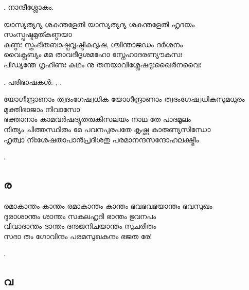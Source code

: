 \begin{enumerate}


. നാന്ദീശ്ലോകം.

\begin{slokam}{\VSv}{\KD}{യാസ്യത്യദ്യ ശകുന്തളേതി}
യാസ്യത്യദ്യ ശകുന്തളേതി ഹൃദയം സംസ്പൃഷ്ടമുത്കണ്ഠയാ\\
കണ്ഠഃ സ്തംഭിതബാഷ്പവൃഷ്ടികലുഷ, ശ്ചിന്താജഡം ദർശനം \\
വൈക്ലബ്യം മമ താവദീദൃശമഹോ സ്നേഹാദരണ്യൗകസഃ \\
പീഡ്യന്തേ ഗൃഹിണഃ കഥം നു തനയാവിശ്ലേഷദുഃഖൈർനവൈഃ
\end{slokam}



. പരിഭാഷകൾ: ,
.


\begin{slokam}{\VSr}{\Melp}{യോഗീന്ദ്രാണാം ത്വദംഗേഷ്വധിക}
യോഗീന്ദ്രാണാം ത്വദംഗേഷ്വധികസുമധുരം മുക്തിഭാജാം നിവാസോ\\
ഭക്താനാം കാമവർഷദ്യുതരുകിസലയം നാഥ തേ പാദമൂലം\\
നിത്യം ചിത്തസ്ഥിതം മേ പവനപുരപതേ കൃഷ്ണ കാരുണ്യസിന്ധോ\\
ഹൃത്വാ നിഃശേഷതാപാൻപ്രദിശതു പരമാനന്ദസന്ദോഹലക്ഷ്മീം
\end{slokam}


.



\end{enumerate}

\subsection{ര}

\begin{enumerate}

\begin{slokam}{\VSk}{\Unk}{രമാകാന്തം കാന്തം}
രമാകാന്തം കാന്തം ഭവഭവഭയാന്തം ഭവസുഖം\\
ദുരാശാന്തം ശാന്തം സകലഹൃദി ഭാന്തം ഭുവനപം\\
വിവാദാന്തം ദാന്തം ദനുജനിചയാന്തം സുചരിതം\\
സദാ തം ഗോവിന്ദം പരമസുഖകന്ദം ഭജത രേ!
\end{slokam}


.

\end{enumerate}

\subsection{വ}

